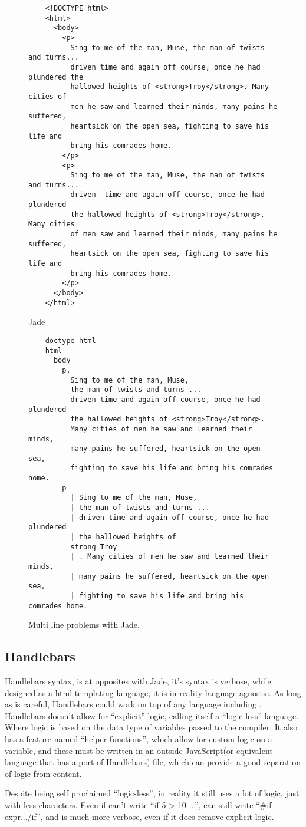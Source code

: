 \begin{figure}[ht!]
    \large{}\normalsize{}
    \begin{verbatim}
    <!DOCTYPE html>
    <html>
      <body>
        <p>
          Sing to me of the man, Muse, the man of twists and turns... 
          driven time and again off course, once he had plundered the
          hallowed heights of <strong>Troy</strong>. Many cities of 
          men he saw and learned their minds, many pains he suffered, 
          heartsick on the open sea, fighting to save his life and 
          bring his comrades home.
        </p>
        <p>
          Sing to me of the man, Muse, the man of twists and turns... 
          driven  time and again off course, once he had plundered
          the hallowed heights of <strong>Troy</strong>. Many cities
          of men saw and learned their minds, many pains he suffered, 
          heartsick on the open sea, fighting to save his life and 
          bring his comrades home.
        </p>
      </body>
    </html>
    \end{verbatim}
    \large{Jade}\normalsize{}
    \begin{verbatim}
    doctype html
    html
      body
        p.
          Sing to me of the man, Muse, 
          the man of twists and turns ... 
          driven time and again off course, once he had plundered 
          the hallowed heights of <strong>Troy</strong>. 
          Many cities of men he saw and learned their minds, 
          many pains he suffered, heartsick on the open sea, 
          fighting to save his life and bring his comrades home. 
        p
          | Sing to me of the man, Muse, 
          | the man of twists and turns ... 
          | driven time and again off course, once he had plundered 
          | the hallowed heights of 
          strong Troy 
          | . Many cities of men he saw and learned their minds, 
          | many pains he suffered, heartsick on the open sea, 
          | fighting to save his life and bring his comrades home. 
    \end{verbatim}
    \caption{Multi line problems with Jade.}
    \label{fig:JadeMultiLine}
\end{figure}


\subsection{Handlebars}

Handlebars syntax, is at opposites with Jade, it's syntax is verbose, while designed as a html templating language, it is in reality language agnostic. As long as \you{} is careful, Handlebars could work on top of any language including \languageName{}. Handlebars doesn't allow for ``explicit'' logic, calling itself a ``logic-less'' language. Where logic is based on the data type of variables passed to the compiler. It also has a feature named ``helper functions'', which allow for custom logic on a variable, and these must be written in an outside JavaScript(or equivalent language that has a port of Handlebars) file, which can provide a good separation of logic from content.

Despite being self proclaimed ``logic-less'', in reality it still uses a lot of logic, just with less characters. Even if \you{} can't write ``if 5 > 10 {...}'', \you{} can still write ``{{\#if expr}}...{{/if}}'', and is much more verbose, even if it does remove explicit logic.